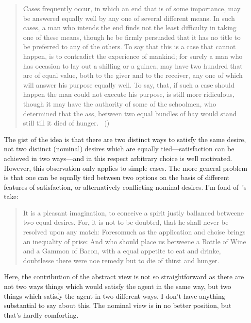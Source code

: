 \documentclass[10pt]{article}
\begin{document}
\begin{quote}
  Cases frequently occur, in which an end that is of some importance, may be answered equally well by any one of several different means.
  In such cases, a man who intends the end finds not the least difficulty in taking one of these means, though he be firmly persuaded that it has no title to be preferred to any of the others.
  To say that this is a case that cannot happen, is to contradict the experience of mankind; for surely a man who has occasion to lay out a shilling or a guinea, may have two hundred that are of equal value, both to the giver and to the receiver, any one of which will answer his purpose equally well.
  To say, that, if such a case should happen the man could not execute his purpose, is still more ridiculous, though it may have the authority of some of the schoolmen, who determined that the ass, between two equal bundles of hay would stand still till it died of hunger.\nolinebreak
  \mbox{ }\hfill(\citeyear[233--234]{Reid:1815aa})
\end{quote}

The gist of the idea is that there are two distinct ways to satisfy the same desire, not two distinct (nominal) desires which are equally tied---satisfaction can be achieved in two ways---and in this respect arbitrary choice is well motivated.
However, this observation only applies to simple cases.
The more general problem is that one can be equally tied between two options on the basis of different features of satisfaction, or alternatively conflicting nominal desires.
I'm fond of~\citeauthor{Montaigne:1965aa}'s take:

\begin{quote}
  It is a pleasant imagination, to conceive a spirit justly ballanced betweene two equal desires.
  For, it is not to be doubted, that he shall never be resolved upon any match:
  Foresomuch as the application and choise brings an inequality of prise:
  And who should place us betweene a Bottle of Wine and a Gammon of Bacon, with a equal appetite to eat and drinke, doubtlesse there were noe remedy but to die of thirst and hunger.
\end{quote}

Here, the contribution of the abstract view is not so straightforward as there are not two ways things which would satisfy the agent in the same way, but two things which satisfy the agent in two different ways.
I don't have anything substantial to say about this.
The nominal view is in no better position, but that's hardly comforting.
\end{document}
